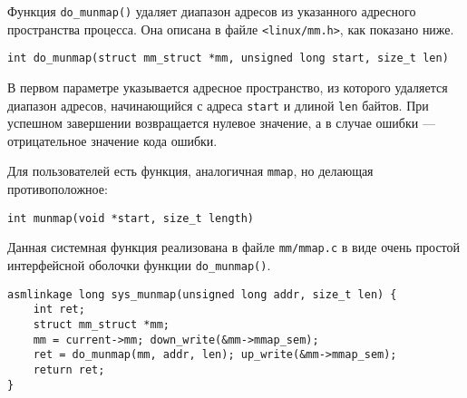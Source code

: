 \documentclass[12pt]{article}
\begin{document}
Функция \verb!do_munmap()! удаляет диапазон адресов из указанного адресного пространства процесса. 
Она описана в файле \verb!<linux/mm.h>!, как показано ниже.

\begin{lstlisting}
int do_munmap(struct mm_struct *mm, unsigned long start, size_t len)
\end{lstlisting}


В первом параметре указывается адресное пространство, из которого удаляется 
диапазон адресов, начинающийся с адреса \verb!start! и длиной \verb!len! байтов. 
При успешном завершении возвращается нулевое значение, а в случае ошибки — отрицательное значение кода ошибки.

Для пользователей есть функция, аналогичная \verb!mmap!, но делающая противоположное:

\begin{lstlisting}
int munmap(void *start, size_t length)
\end{lstlisting}

Данная системная функция реализована в файле \verb!mm/mmap.c! в виде очень простой интерфейсной
оболочки функции \verb!do_munmap()!.

\begin{lstlisting}
asmlinkage long sys_munmap(unsigned long addr, size_t len) {
    int ret;
    struct mm_struct *mm;
    mm = current->mm; down_write(&mm->mmap_sem);
    ret = do_munmap(mm, addr, len); up_write(&mm->mmap_sem);
    return ret;
}
\end{lstlisting}
\end{document}
